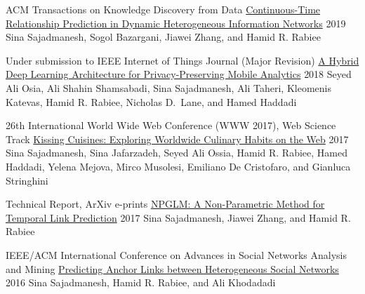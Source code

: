 \begin{cventries}
    
    \cventrypub
    {ACM Transactions on Knowledge Discovery from Data}
    {\href{https://arxiv.org/abs/1710.00818}{Continuous-Time Relationship Prediction in Dynamic Heterogeneous Information Networks}}
    {}
    {2019}
    {Sina Sajadmanesh, Sogol Bazargani, Jiawei Zhang, and Hamid R. Rabiee}
    
    \cventrypub
    {Under submission to IEEE Internet of Things Journal (Major Revision)}
    {\href{https://arxiv.org/abs/1703.02952}{A Hybrid Deep Learning Architecture for Privacy-Preserving Mobile Analytics}}
    {}
    {2018}
    {Seyed Ali Osia, Ali Shahin Shamsabadi, Sina Sajadmanesh, Ali Taheri, Kleomenis Katevas, Hamid R. Rabiee,
    Nicholas D.~Lane, and Hamed Haddadi}
    
    \cventrypub
    {26th International World Wide Web Conference (WWW 2017), Web Science Track}
    {\href{https://arxiv.org/abs/1610.08469}{Kissing Cuisines: Exploring Worldwide Culinary Habits on the Web}}
    {}
    {2017}
    {Sina Sajadmanesh, Sina Jafarzadeh, Seyed Ali Ossia, Hamid R. Rabiee, Hamed Haddadi, Yelena Mejova, Mirco Musolesi, Emiliano De Cristofaro, and Gianluca Stringhini}
    
    \cventrypub
    {Technical Report, ArXiv e-prints}
    {\href{https://arxiv.org/abs/1706.06783}{NPGLM: A Non-Parametric Method for Temporal Link Prediction}}
    {}
    {2017}
    {Sina Sajadmanesh, Jiawei Zhang, and Hamid R. Rabiee}
    
    
    
  \cventrypub
    {IEEE/ACM International
Conference on Advances in Social Networks Analysis and Mining}
    {\href{https://arxiv.org/abs/1607.08821}{Predicting Anchor
Links between Heterogeneous Social Networks}}
    {}
    {2016}
    {Sina Sajadmanesh, Hamid R. Rabiee, and Ali Khodadadi}
\end{cventries}
